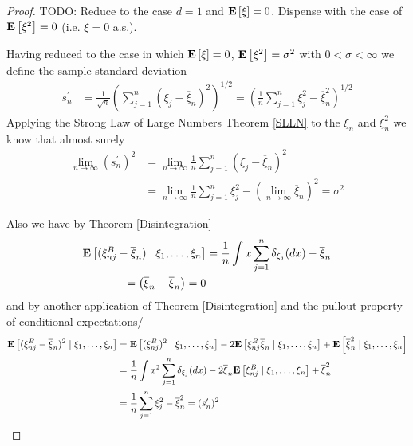 \begin{proof}
TODO: Reduce to the case $d=1$ and $\expectation{\xi} = 0$.  Dispense with the case of $\expectation{\xi^2} = 0$ (i.e. $\xi = 0$ a.s.).

Having reduced to the case in which $\expectation{\xi}=0$, $\expectation{\xi^2}=\sigma^2$ with $0 < \sigma < \infty$ we define the sample standard deviation
\begin{align*}
s^\prime_n &= \frac{1}{\sqrt{n}} \left( \sum_{j=1}^n \left( \xi_j - \overline{\xi}_n \right)^2 \right)^{1/2} = \left( \frac{1}{n} \sum_{j=1}^n \xi^2_j - \overline{\xi}^2_n \right)^{1/2}
\end{align*}
Applying the Strong Law of Large Numbers Theorem \ref{SLLN} to the $\xi_n$  and $\xi^2_n$ we know that almost surely
\begin{align*}
\lim_{n \to \infty} (s^\prime_n)^2 &=\lim_{n \to \infty} \frac{1}{n} \sum_{j=1}^n (\xi_j - \overline{\xi}_n)^2 \\
&=\lim_{n \to \infty} \frac{1}{n} \sum_{j=1}^n \xi^2_j - \left(\lim_{n \to \infty} \overline{\xi}_n\right)^2 = \sigma^2
\end{align*}

Also we have by Theorem \ref{Disintegration}
\begin{align*}
\cexpectationlong{\xi_1, \dotsc, \xi_n} { (\xi^B_{nj} - \overline{\xi}_n)} &= \frac{1}{n} \int x \sum_{j=1}^n \delta_{\xi_j}(dx) - \overline{\xi}_n \\
= \left(  \overline{\xi}_n - \overline{\xi}_n \right) = 0
\end{align*}
and by another application of Theorem \ref{Disintegration} and the pullout property of conditional expectations/
\begin{align*}
\cexpectationlong{\xi_1, \dotsc, \xi_n} { (\xi^B_{nj} - \overline{\xi}_n)^2} 
&=\cexpectationlong{\xi_1, \dotsc, \xi_n} { (\xi^B_{nj})^2} - 2 \cexpectationlong{\xi_1, \dotsc, \xi_n} {\xi^B_{nj} \overline{\xi}_n} + \cexpectationlong{\xi_1, \dotsc, \xi_n} {\overline{\xi}_n^2}  \\
&= \frac{1}{n} \int x^2 \sum_{j=1}^n \delta_{\xi_j}(dx) - 2 \overline{\xi}_n \cexpectationlong{\xi_1, \dotsc, \xi_n} {\xi^B_{nj} } +\overline{\xi}_n^2 \\
&= \frac{1}{n} \sum_{j=1}^n \xi_j^2 - \overline{\xi}_n^2 = (s^\prime_n)^2
\end{align*}


\end{proof}
